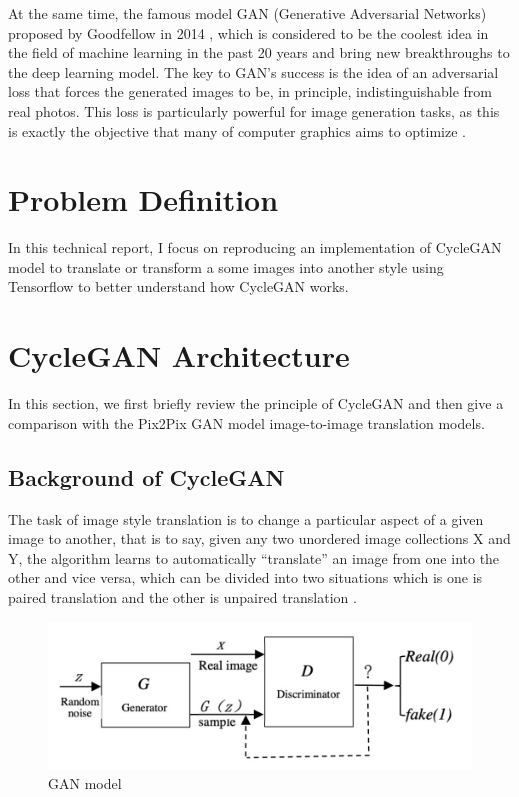 \documentclass[peerreview]{IEEEtran}
\begin{document}
At the same time, the famous model GAN (Generative Adversarial Networks) proposed by Goodfellow in 2014 \cite{goodfellow2014generative}, which is considered to be the coolest idea in the field of machine learning in the past 20 years and bring new breakthroughs to the deep learning model. The key to GAN's success is the idea of an adversarial loss that forces the generated images to be, in principle, indistinguishable from real photos. This loss is particularly powerful for image generation tasks, as this is exactly the objective that many of computer graphics aims to optimize \cite{zhu2019brief}.


\section{Problem Definition}
In this technical report, I focus on reproducing an implementation of CycleGAN model to translate or transform a some images into another style using Tensorflow to better understand how CycleGAN works.


\section{CycleGAN Architecture}
In this section, we first briefly review the principle of CycleGAN and then give a comparison with the Pix2Pix GAN model image-to-image translation models.

\subsection{Background of CycleGAN}
The task of image style translation is to change a particular aspect of a given image to another, that is to say, given any two unordered image collections X and Y, the algorithm learns to automatically “translate” an image from one into the other and vice versa, which can be divided into two situations which is one is paired translation and the other is unpaired translation \cite{upadhyay2021uncertainty}.

\begin{figure}[H]
    \centering
    \includegraphics[width=0.8\columnwidth]{GAN Model}
    \caption{GAN model}
    \label{fig:s=gan_model}
\end{figure}
\end{document}
